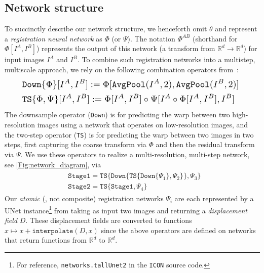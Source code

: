 \subsection{Network structure}
\label{subsection:networkstructure}
\vspace{-0.15cm}
To succinctly describe our network structure, we henceforth omit $\theta$ and represent a \emph{registration neural network} as $\Phi$ (or \eg $\Psi$). The notation $\Phi^{AB}$ (shorthand for $\Phi[I^A, I^B]$) represents the output of this network (a transform from $\mathbb{R}^d \rightarrow{} \mathbb{R}^d$) for input images $I^A$ and $I^B$.  To combine such registration networks into a multistep, multiscale approach, we rely on the following combination operators from~\cite{greer2021icon}:
\begin{equation*}
\resizebox{.9\columnwidth}{!}{%
$
\begin{split}
    & \texttt{Down}\{\Phi\}[I^A, I^B] := \Phi[\texttt{AvgPool}(I^A, 2), \texttt{AvgPool}(I^B, 2)] \\
    & \texttt{TS}\{\Phi, \Psi\}[I^A, I^B] := \Phi[I^A, I^B] \circ \Psi[I^A \circ \Phi[I^A, I^B], I^B]
\end{split}
 $
 }
\end{equation*}
The downsample operator (\texttt{Down}) is for predicting the warp between two high-resolution images using a network that operates on low-resolution images, and the two-step operator (\texttt{TS}) is for predicting the warp between two images in two steps, first capturing the coarse transform via $\Phi$ and then the residual transform via $\Psi$.
We use these operators to realize a multi-resolution, multi-step network, see \ref{Fig:network_diagram}, via
\begin{align}
	\label{equ:network_definition}
	\begin{split}
		&\texttt{Stage1} = \texttt{TS} \{\texttt{Down}\{
		\texttt{TS}\{ \texttt{Down} \{ \Psi_1\}, \Psi_2 \}\}, \Psi_3 \} \,\\
		&\texttt{Stage2}=\texttt{TS} \{ \texttt{Stage1}, \Psi_4\}
	\end{split}
\end{align}
Our \emph{atomic} (\ie, not composite) registration networks $\Psi_i$ are each represented by a UNet instance\footnote{For reference, \texttt{networks.tallUnet2} in the \texttt{ICON} source code.} from \cite{greer2021icon} taking as input two images and returning a \emph{displacement field} $D$. These displacement fields are converted to functions $ x \mapsto x + \texttt{interpolate}(D, x)$ since the above operators are defined on networks that return functions from $\mathbb{R}^d$ to $\mathbb{R}^d$.

